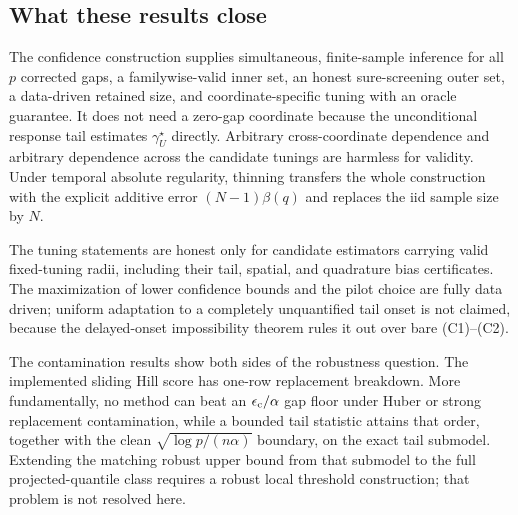 \documentclass[11pt]{article}
\theoremstyle{remark}
\begin{document}
\subsection{What these results close}

The confidence construction supplies simultaneous, finite-sample inference
for all $p$ corrected gaps, a familywise-valid inner set, an honest
sure-screening outer set, a data-driven retained size, and coordinate-specific
tuning with an oracle guarantee.  It does not need a zero-gap coordinate
because the unconditional response tail estimates $\gamma_U^\star$ directly.
Arbitrary cross-coordinate dependence and arbitrary dependence across the
candidate tunings are harmless for validity.  Under temporal absolute
regularity, thinning transfers the whole construction with the explicit
additive error $(N-1)\beta(q)$ and replaces the iid sample size by $N$.

The tuning statements are honest only for candidate estimators carrying valid
fixed-tuning radii, including their tail, spatial, and quadrature bias
certificates.  The maximization of lower confidence bounds and the pilot choice
are fully data driven; uniform adaptation to a completely unquantified tail
onset is not claimed, because the delayed-onset impossibility theorem rules it
out over bare (C1)--(C2).

The contamination results show both sides of the robustness question.  The
implemented sliding Hill score has one-row replacement breakdown.  More
fundamentally, no method can beat an $\epsilon_{\rm c}/\alpha$ gap floor under
Huber or strong replacement contamination, while a bounded tail statistic
attains that order, together with the clean
$\sqrt{\log p/(n\alpha)}$ boundary, on the exact tail submodel.  Extending the
matching robust upper bound from that submodel to the full projected-quantile
class requires a robust local threshold construction; that problem is not
resolved here.
\end{document}
